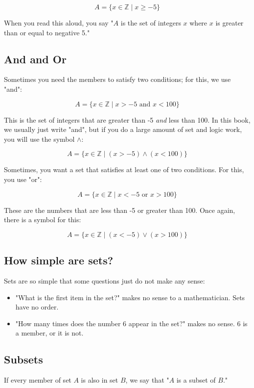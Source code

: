 $$A = \{ x \in \mathbb{Z} \mid x \geq -5 \}$$

When you read this aloud, you say "$A$ is the set of integers $x$
where $x$ is greater than or equal to negative 5."

\subsection{And and Or}

Sometimes you need the members to satisfy two conditions; for this, we
use "and": 

$$A = \{ x \in \mathbb{Z} \mid x > -5 \text{ and }  x < 100\}$$

This is the set of integers that are greater than -5 \textit{and} less
than 100.  In this book, we usually just write "and", but if you do a
large amount of set and logic work, you will use the symbol $\land$:

$$A = \{ x \in \mathbb{Z} \mid (x > -5) \land (x < 100)\}$$

Sometimes, you want a set that satisfies at least one of two
conditions.  For this, you use "or":

$$A = \{ x \in \mathbb{Z} \mid x < -5 \text{ or } x > 100\}$$

These are the numbers that are less than -5 or greater than 100.  Once
again, there is a symbol for this:

$$A = \{ x \in \mathbb{Z} \mid (x < -5) \lor (x > 100)\}$$
\subsection{How simple are sets?}

Sets are so simple that some questions just do not make any sense:
\begin{itemize}
\item "What is the first item in the set?" makes no sense to a mathematician.  Sets have no order.
\item "How many times does the number 6 appear in the set?"  makes no sense.   6 is a member, or it is not.   
\end{itemize}

\subsection{Subsets}

If every member of set $A$ is also in set $B$, we say that "$A$ is a
subset of $B$." 

